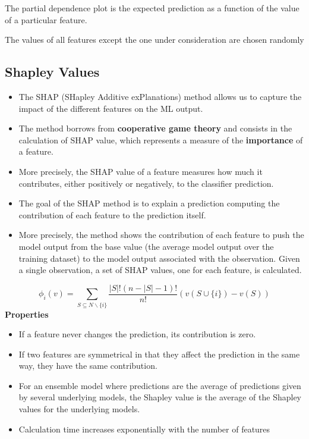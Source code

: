 The partial dependence plot is the expected prediction as a function of the value of a particular feature.

The values of all features except the one under consideration are chosen randomly 

\subsection{Shapley Values}

\begin{itemize}
    \item The SHAP (SHapley Additive exPlanations) method allows us to capture the impact of the different features on the ML output. 
    \item The method borrows from \textbf{cooperative game theory} and consists in the calculation of SHAP value, which represents a measure of the \textbf{importance} of a feature. 
    \item More precisely, the SHAP value of a feature measures how much it contributes, either positively or negatively, to the classifier prediction.
    \item The goal of the SHAP method is to explain a prediction computing the contribution of each feature to the prediction itself.
    \item More precisely, the method shows the contribution of each feature to push the model output from the base value (the average model output over the training dataset) to the model output associated with the observation. Given a single observation, a set of SHAP values, one for each feature, is calculated.
\end{itemize}

\[
    \phi_i (v)=\sum_{S \subseteq N \backslash\{i\}} \frac{|S| !(n-|S|-1) !}{n !}(v(S \cup\{i\})-v(S))
\]
\textbf{Properties}
\begin{itemize}
    \item If a feature never changes the prediction, its contribution is zero. 
    \item If two features are symmetrical in that they affect the prediction in the same way, they have the same contribution. 
    \item For an ensemble model where predictions are the average of predictions given by several underlying models, the Shapley value is the average of the Shapley values for the underlying models. 
    \item Calculation time increases exponentially with the number of features
\end{itemize}

